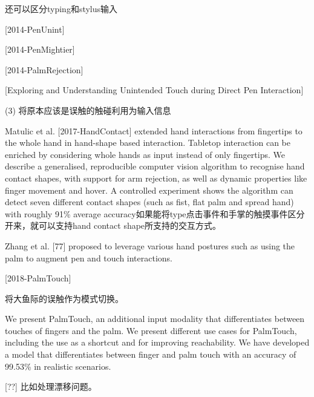 还可以区分typing和stylus输入

[2014-PenUnint]

[2014-PenMightier]

[2014-PalmRejection]

[Exploring and Understanding Unintended Touch during Direct Pen Interaction]

(3) 将原本应该是误触的触碰利用为输入信息

Matulic et al. [2017-HandContact] extended hand interactions from fingertips to the whole hand in hand-shape based interaction. Tabletop interaction can be enriched by considering whole hands as input instead of only fingertips. We describe a
generalised, reproducible computer vision algorithm to recognise hand contact shapes, with support for arm rejection, as well as dynamic properties like finger movement
and hover. A controlled experiment shows the algorithm can detect seven different contact shapes (such as fist, flat palm and spread hand) with roughly 91\% average accuracy如果能将type点击事件和手掌的触摸事件区分开来，就可以支持hand contact shape所支持的交互方式。

Zhang et al. [77] proposed to leverage various hand postures such as using the palm to augment pen and touch interactions.

[2018-PalmTouch]

将大鱼际的误触作为模式切换。

We present PalmTouch, an additional input modality that differentiates between touches of fingers and the palm. We present different use cases for PalmTouch, including the
use as a shortcut and for improving reachability.  We have developed a model that differentiates between finger and palm touch with an accuracy of 99.53\% in realistic scenarios.

[??] 比如处理漂移问题。


